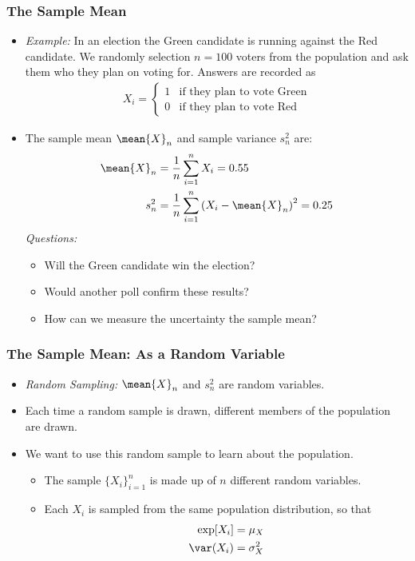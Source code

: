 

\begin{frame}
\frametitle{The Sample Mean} 
\begin{itemize}
\item \emph{Example:} In an election the Green candidate is running against the Red candidate. We randomly selection $n=100$ voters from the population and ask them who they plan on voting for. Answers are recorded as 
\begin{align*}
X_i = 
  \begin{cases}
  1 & \text{if they plan to vote Green} \\
  0 & \text{if they plan to vote Red}
  \end{cases}
\end{align*} 
\item The sample mean $\mean{X}_n$ and sample variance $s_n^2$ are:
\begin{align*}
\mean{X}_n 
    & = \frac{1}{n}\sum_{i=1}^n X_i = 0.55\\
s_n^2 
    & = \frac{1}{n}\sum_{i=1}^n \left(X_i-\mean{X}_n\right)^2 
      = 0.25
\end{align*}
\emph{Questions:}
\begin{itemize}
\item Will the Green candidate win the election?
\item Would another poll confirm these results?
\item How can we measure the uncertainty the sample mean?
\end{itemize}
\end{itemize}
\end{frame}


\begin{frame}
\frametitle{The Sample Mean: As a Random Variable} 
\begin{itemize}
\item \emph{Random Sampling:} $\mean{X}_n$ and $s_n^2$ are random variables.
\item Each time a random sample is drawn, different members of the population are drawn.
\item We want to use this random sample to learn about the population.
\begin{itemize}
\item The sample $\{X_i\}_{i=1}^n$ is made up of $n$ different random variables.
\item Each $X_i$ is sampled from the same population distribution, so that 
\begin{align*}
\exp[X_i] & = \mu_X\\
\var(X_i) & = \sigma_X^2
\end{align*}
\end{itemize}
\end{itemize}
\end{frame}


